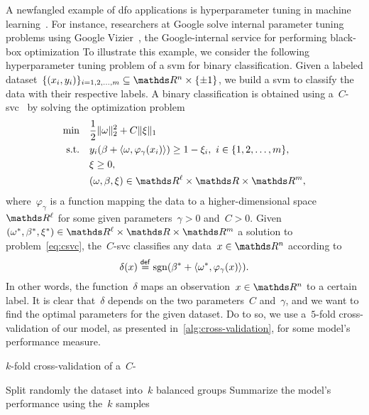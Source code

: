 A newfangled example of \gls{dfo} applications is hyperparameter tuning in machine learning~\cite{Ghanbari_Scheinberg_2017}.
For instance, researchers at Google solve internal parameter tuning problems using Google Vizier~\cite{Golovin_Etal_2017}, the Google-internal service for performing black-box optimization
To illustrate this example, we consider the following hyperparameter tuning problem of a \gls{svm} for binary classification.
Given a labeled dataset~$\set{(x_i, y_i)}_{i = 1, 2, \dots, m} \subseteq \R^n \times \set{\pm 1}$, we build a \gls{svm} to classify the data with their respective labels.
A binary classification is obtained using a~$C$-\gls{svc}~\cite{Chang_Lin_2011} by solving the optimization problem
\begin{subequations}
    \label{eq:csvc}
    \begin{align}
        \min        & \quad \frac{1}{2} \norm{\omega}_2^2 + C \norm{\xi}_1\\
        \text{s.t.} & \quad y_i (\beta + \inner{\omega, \varphi_{\gamma}(x_i)}) \ge 1 - \xi_i, ~ i \in \set{1, 2, \dots, m},\\
                    & \quad \xi \ge 0,\\
                    & \quad (\omega, \beta, \xi) \in \R^{\ell} \times \R \times \R^m,
    \end{align}
\end{subequations}
where~$\varphi_{\gamma}$ is a function mapping the data to a higher-dimensional space~$\R^{\ell}$ for some given parameters~$\gamma > 0$ and~$C > 0$.
Given~$(\omega^{\ast}, \beta^{\ast}, \xi^{\ast}) \in \R^{\ell} \times \R \times \R^m$ a solution to problem~\cref{eq:csvc}, the~$C$-\gls{svc} classifies any data~$x \in \R^n$ according to
\begin{equation*}
    \delta(x) \mathrel{\stackrel{\mathsf{def}}{=}} \operatorname{sgn}(\beta^{\ast} + \langle\omega^{\ast}, \varphi_{\gamma}(x)\rangle).
\end{equation*}
In other words, the function~$\delta$ maps an observation~$x \in \R^n$ to a certain label.
It is clear that~$\delta$ depends on the two parameters~$C$ and~$\gamma$, and we want to find the optimal parameters for the given dataset.
Do to so, we use a~$5$-fold cross-validation of our model, as presented in~\cref{alg:cross-validation}, for some model's performance measure.

\begin{algorithm}[htp]
    \caption{$k$-fold cross-validation of a~$C$-}
    \label{alg:cross-validation}
    \DontPrintSemicolon
    Split randomly the dataset into~$k$ balanced groups\;
    Summarize the model's performance using the~$k$ samples\;
\end{algorithm}

